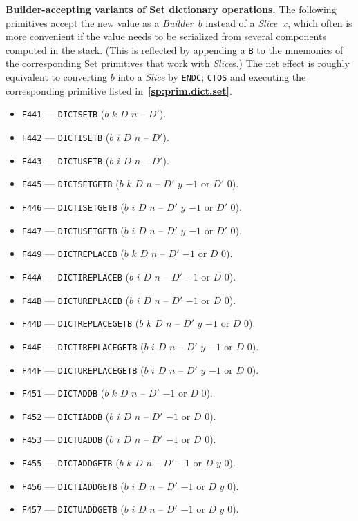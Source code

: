 \documentclass[12pt,oneside]{article}
\def\makepoint#1{\medbreak\noindent{\bf #1.\ }}
\def\nxsubpoint{\refstepcounter{subsubsection}%
    \smallbreak\makepoint{\thesubsubsection}}
\def\refpoint#1{{\rm\textbf{\ref{#1}}}}
\let\ptref=\refpoint
\def\emb#1{\textbf{#1.}}
\begin{document}
\nxsubpoint\label{sp:prim.dict.set.builder}\emb{Builder-accepting variants of {\sc Set} dictionary operations}
The following primitives accept the new value as a {\em Builder}~$b$ instead of a {\em Slice}~$x$, which often is more convenient if the value needs to be serialized from several components computed in the stack. (This is reflected by appending a {\tt B} to the mnemonics of the corresponding {\sc Set} primitives that work with {\em Slice\/}s.) The net effect is roughly equivalent to converting $b$ into a {\em Slice\/} by {\tt ENDC}; {\tt CTOS} and executing the corresponding primitive listed in~\ptref{sp:prim.dict.set}.
\begin{itemize}
\item {\tt F441} --- {\tt DICTSETB} ($b$ $k$ $D$ $n$ -- $D'$).
\item {\tt F442} --- {\tt DICTISETB} ($b$ $i$ $D$ $n$ -- $D'$).
\item {\tt F443} --- {\tt DICTUSETB} ($b$ $i$ $D$ $n$ -- $D'$).
\item {\tt F445} --- {\tt DICTSETGETB} ($b$ $k$ $D$ $n$ -- $D'$ $y$ $-1$ or $D'$ $0$).
\item {\tt F446} --- {\tt DICTISETGETB} ($b$ $i$ $D$ $n$ -- $D'$ $y$ $-1$ or $D'$ $0$).
\item {\tt F447} --- {\tt DICTUSETGETB} ($b$ $i$ $D$ $n$ -- $D'$ $y$ $-1$ or $D'$ $0$).
\item {\tt F449} --- {\tt DICTREPLACEB} ($b$ $k$ $D$ $n$ -- $D'$ $-1$ or $D$ $0$).
\item {\tt F44A} --- {\tt DICTIREPLACEB} ($b$ $i$ $D$ $n$ -- $D'$ $-1$ or $D$ $0$).
\item {\tt F44B} --- {\tt DICTUREPLACEB} ($b$ $i$ $D$ $n$ -- $D'$ $-1$ or $D$ $0$).
\item {\tt F44D} --- {\tt DICTREPLACEGETB} ($b$ $k$ $D$ $n$ -- $D'$ $y$ $-1$ or $D$ $0$).
\item {\tt F44E} --- {\tt DICTIREPLACEGETB} ($b$ $i$ $D$ $n$ -- $D'$ $y$ $-1$ or $D$ $0$).
\item {\tt F44F} --- {\tt DICTUREPLACEGETB} ($b$ $i$ $D$ $n$ -- $D'$ $y$ $-1$ or $D$ $0$).
\item {\tt F451} --- {\tt DICTADDB} ($b$ $k$ $D$ $n$ -- $D'$ $-1$ or $D$ $0$).
\item {\tt F452} --- {\tt DICTIADDB} ($b$ $i$ $D$ $n$ -- $D'$ $-1$ or $D$ $0$).
\item {\tt F453} --- {\tt DICTUADDB} ($b$ $i$ $D$ $n$ -- $D'$ $-1$ or $D$ $0$).
\item {\tt F455} --- {\tt DICTADDGETB} ($b$ $k$ $D$ $n$ -- $D'$ $-1$ or $D$ $y$ $0$).
\item {\tt F456} --- {\tt DICTIADDGETB} ($b$ $i$ $D$ $n$ -- $D'$ $-1$ or $D$ $y$ $0$).
\item {\tt F457} --- {\tt DICTUADDGETB} ($b$ $i$ $D$ $n$ -- $D'$ $-1$ or $D$ $y$ $0$).
\end{itemize}
\end{document}
